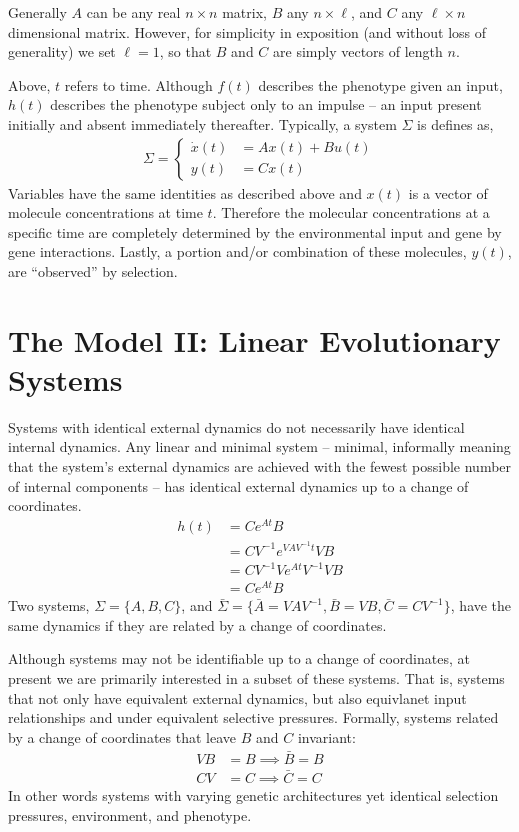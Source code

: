 \documentclass[9 pt]{article}
\newcommand{\1}{\mathbbm{1}}
\begin{document}
\begin{multicols}{2}
  Generally $A$ can be any real $n \times n$ matrix, $B$ any $n \times \ell$, and $C$ any $\ell \times n$ dimensional matrix. However, for simplicity in exposition (and without loss of generality) we set $\ell = 1$, so that $B$ and $C$ are simply vectors of length $n$.

  Above, $t$ refers to time. Although $f(t)$ describes the phenotype given an input, $h(t)$ describes the phenotype subject only to an impulse -- an input present initially and absent immediately thereafter. Typically, a system $\Sigma$ is defines as,
  \begin{align}
    \Sigma = \left\{ \begin{array}{ll} \dot{x}(t) &= A x(t) + B u(t) \\ y(t) &= C x(t) \end{array} \right.
  \end{align}
  Variables have the same identities as described above and $x(t)$ is a vector of molecule concentrations at time $t$. Therefore the molecular concentrations at a specific time are completely determined by the environmental input and gene by gene interactions. Lastly, a portion and/or combination of these molecules, $y(t)$, are ``observed'' by selection.

  \section*{The Model II: Linear Evolutionary Systems}

  Systems with identical external dynamics do not necessarily have identical internal dynamics. Any linear and minimal system -- minimal, informally meaning that the system's external dynamics are achieved with the fewest possible number of internal components -- has identical external dynamics up to a change of coordinates. 
  \begin{align}
    h(t) &= C e^{A t} B \\
    &= C V^{-1} e^{V A V^{-1} t} V B \\
    &= C V^{-1} V e^{A t} V^{-1} V B \\
    &= C e^{A t} B
  \end{align}
  Two systems, $\Sigma = \{ A, B, C \}$, and $\bar{\Sigma} = \{\bar{A} = VAV^{-1}, \bar{B} = VB, \bar{C} = CV^{-1} \}$, have the same dynamics if they are related by a change of coordinates. 

  Although systems may not be identifiable up to a change of coordinates, at present we are primarily interested in a subset of these systems. That is, systems that not only have equivalent external dynamics, but also equivlanet input relationships and under equivalent selective pressures. Formally, systems related by a change of coordinates that leave $B$ and $C$ invariant:
  \begin{align}
    VB &= B \implies \bar{B} = B \\
    CV &= C \implies \bar{C} = C
  \end{align}
  In other words systems with varying genetic architectures yet identical selection pressures, environment, and phenotype. 


\end{multicols}
\end{document}
